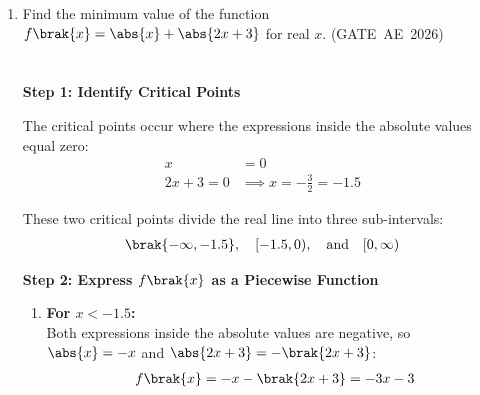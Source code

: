 \begin{enumerate}
\solution \\ 
\noindent \textbf{Step 1: Set up the Integral} \\
For $t > 0$, the function takes the value $u\brak{t} = 1$. Because altering a function's value at a single point ($t = 0$) does not affect the value of a definite integral:
\begin{align}
\mathcal{L}\{u\brak{t}\} = \int_{0}^{\infty} \brak{1} \cdot e^{-st} \, dt
\end{align}

\noindent \textbf{Step 2: Evaluate the Integral} \\
Integrating with respect to $t$:
\begin{align}
\mathcal{L}\{u\brak{t}\} &= \left[ \frac{e^{-st}}{-s} \right]_{0}^{\infty} \\[1.5ex]
&= \lim_{t \to \infty} \brak{ \frac{e^{-st}}{-s} } - \brak{ \frac{e^0}{-s} } \\[1.5ex]
&= 0 - \brak{ -\frac{1}{s} } \\[1.5ex]
&= \frac{1}{s}
\end{align}

\noindent \textbf{Final Answer}\\
\begin{align}
\mathcal{L}\{u\brak{t}\} = \frac{1}{s} \quad 
\end{align}
\newpage
\item 
Find the minimum value of the function $f\brak{x} = \abs{x} + \abs{2x+3}$ for real $x$. \hfill (GATE~AE~2026)\\ \\
\solution \\ 
\noindent \textbf{Step 1: Identify Critical Points}

\noindent The critical points occur where the expressions inside the absolute values equal zero:
\begin{align}
x &= 0 \\[0.5ex]
2x + 3 = 0 &\implies x = -\frac{3}{2} = -1.5
\end{align}

\noindent These two critical points divide the real line into three sub-intervals:
\begin{align}
\brak{-\infty, -1.5}, \quad [-1.5, 0), \quad \text{and} \quad [0, \infty)
\end{align}

\noindent \textbf{Step 2: Express $f\brak{x}$ as a Piecewise Function} \\

\begin{enumerate}
    \item \textbf{For $x < -1.5$:} \\
    Both expressions inside the absolute values are negative, so $\abs{x} = -x$ and $\abs{2x+3} = -\brak{2x+3}$:
    \begin{align}
    f\brak{x} = -x - \brak{2x + 3} = -3x - 3
    \end{align}


\end{enumerate}
\end{enumerate}
